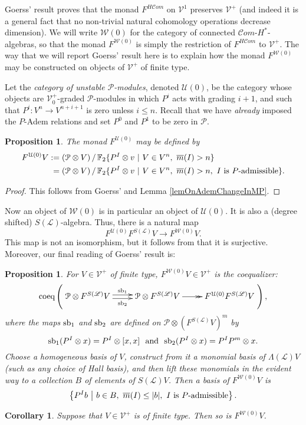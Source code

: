 \documentclass[11pt]{amsart} \renewcommand{\baselinestretch}{1.2}
\theoremstyle{plain}
\newtheorem{prop}[thm]{Proposition}
\newtheorem{cor}[thm]{Corollary}
\theoremstyle{definition}
\renewcommand{\to}{\longrightarrow}
\newcommand{\scrL}{\mathscr{L}}
\newcommand{\scrC}{\mathscr{C}}
\newcommand{\calU}{\mathcal{U}}
\newcommand{\calP}{\mathcal{P}}
\newcommand{\calV}{\mathcal{V}}
\newcommand{\calw}{\mathcal{W}}
\newcommand{\calu}{\mathcal{U}}
\newcommand{\Palg}{{\calP}}
\newcommand{\LieOperad}{{\scrL}}
\newcommand{\vect}[2]{\calV^{#1}_{#2}}
\newcommand{\HA}[1]{H#1}
\newcommand{\minDimP}{\overline{m}}
\newcommand{\F}{\mathbb{F}}
\newcommand{\algs}{{\scrC\!\textit{om}}}
\newcommand{\Ftwo}{\F_2}
\begin{document}
\begin{Constructing cohomology operations}
Goerss' result proves that the monad
$F^{\HA{\algs}}$ on $\vect{1}{}$
preserves $\vect{+}{}$ (and indeed it is a general fact that no non-trivial natural cohomology operations decrease dimension).
We will write $\calw(0)$ for the category of connected $\algs$-$H^*$-algebras, so that the monad $F^{\calw(0)}$  is simply the restriction of $F^{\HA{\algs}}$ to $\vect{+}{}$. The way that we will report Goerss' result here is to explain how the monad $F^{\calw(0)}$ may be constructed on objects of $\vect{+}{}$ of finite type.

Let the \emph{category of unstable $\Palg$-modules}, denoted $\calU(0)$, be the category whose objects are $\vect{+}{0}$-graded $\Palg$-modules in which $P^i$ acts with grading $i+1$, and such that $P^i:V^n\to V^{n+i+1}$ is zero unless $i\leq n$. Recall that  we have \emph{already} imposed the $P$-Adem relations and set $P^0$ and $P^1$ to be zero in $\Palg$. 
\begin{prop}
The monad $F^{\calU(0)}$ may be defined by
\begin{alignat*}{2}
F^{\calU(0)}V
:={}&
(\Palg\otimes V)\,/\,\Ftwo \{P^I\otimes v\ |\ V\in V^n,\ \minDimP(I)>n \}%
\\
={}&
(\Palg\otimes V)\,/\,\Ftwo \{P^I\otimes v\ |\ V\in V^n,\ \minDimP(I)>n ,\ I\textup{ is $P$-admissible}\}.%
\end{alignat*}
\end{prop}
\begin{proof}
This follows from Goerss' \cite[Theorem I]{MR1089001} and Lemma \ref{lemOnAdemChangeInMP}.
\end{proof}
Now an object of $\calw(0)$ is in particular an object of $\calU(0)$. It is also a (degree shifted) $S(\LieOperad)$-algebra. Thus, there  is a natural map 
\[F^{\calU(0)}F^{S(\LieOperad)}V\to F^{\calw(0)}V.\]
This map is not an isomorphism, but it follows from \cite[Theorem I]{MR1089001} that it is surjective. Moreover, our final reading of Goerss' result is:
\begin{prop}
\label{partialgoerss}
For $V\in\vect{+}{}$ of finite type,  $F^{\calw(0)}V\in \vect{+}{}$ is the coequalizer:
\[\textup{coeq}\left(\xymatrix@R=4mm{
\Palg\otimes F^{S(\LieOperad)}V
\ar@<+.5ex>[r]^-{\smash{\textup{sb}_1}}
\ar@<-.5ex>[r]_-{\textup{sb}_2}
&%
\Palg\otimes F^{S(\LieOperad)}V
\ar@{->>}[r]
&
F^{\calu(0)}F^{S(\LieOperad)}V%
}\right),\]
where the maps $\textup{sb}_1$ and $\textup{sb}_2$ are defined on  $\Palg\otimes(F^{S(\LieOperad)}V)^{m}$ by
\[\textup{sb}_1(P^I\otimes x)=P^I\otimes [x,x]\textup{ \ and \ }\textup{sb}_2(P^I\otimes x)=P^IP^m\otimes x.\]
Choose a homogeneous basis of $V$, construct from it a monomial  basis of $\Lambda(\LieOperad)V$ (such as any choice of Hall basis), and then lift these monomials in the evident way to a collection $B$ of elements of $S(\LieOperad)V$. Then a basis of $F^{\calw(0)}V$ is 
\[\left\{P^Ib\ \middle|\ b\in B,\ \minDimP(I)\leq|b|,\ \textup{$I$ is $P$-admissible}\right\}.\]
\end{prop}
\begin{cor}
\label{finite type pres by FW0}
Suppose that $V\in\vect{+}{}$ is of finite type. Then so is $F^{\calw(0)}V$.
\end{cor}


\end{Constructing cohomology operations}
\end{document}
